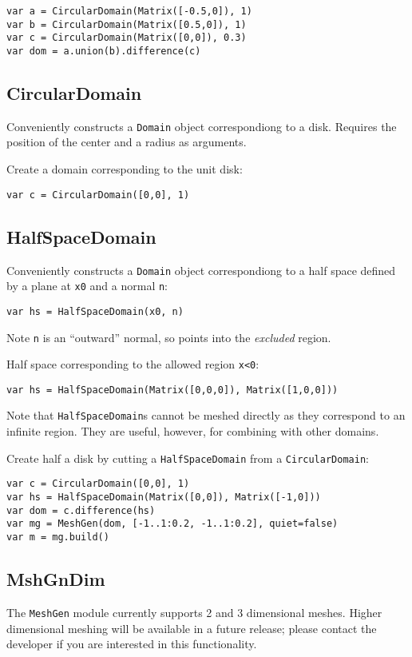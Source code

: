\begin{lstlisting}
var a = CircularDomain(Matrix([-0.5,0]), 1)
var b = CircularDomain(Matrix([0.5,0]), 1)
var c = CircularDomain(Matrix([0,0]), 0.3)
var dom = a.union(b).difference(c)
\end{lstlisting}

\hypertarget{circulardomain}{%
\subsection{CircularDomain}\label{circulardomain}}

Conveniently constructs a \texttt{Domain} object correspondiong to a
disk. Requires the position of the center and a radius as arguments.

Create a domain corresponding to the unit disk:

\begin{lstlisting}
var c = CircularDomain([0,0], 1)
\end{lstlisting}

\hypertarget{halfspacedomain}{%
\subsection{HalfSpaceDomain}\label{halfspacedomain}}

Conveniently constructs a \texttt{Domain} object correspondiong to a
half space defined by a plane at \texttt{x0} and a normal \texttt{n}:

\begin{lstlisting}
var hs = HalfSpaceDomain(x0, n)
\end{lstlisting}

Note \texttt{n} is an ``outward'' normal, so points into the
\emph{excluded} region.

Half space corresponding to the allowed region \texttt{x\textless{}0}:

\begin{lstlisting}
var hs = HalfSpaceDomain(Matrix([0,0,0]), Matrix([1,0,0]))
\end{lstlisting}

Note that \texttt{HalfSpaceDomain}s cannot be meshed directly as they
correspond to an infinite region. They are useful, however, for
combining with other domains.

Create half a disk by cutting a \texttt{HalfSpaceDomain} from a
\texttt{CircularDomain}:

\begin{lstlisting}
var c = CircularDomain([0,0], 1)
var hs = HalfSpaceDomain(Matrix([0,0]), Matrix([-1,0]))
var dom = c.difference(hs) 
var mg = MeshGen(dom, [-1..1:0.2, -1..1:0.2], quiet=false)
var m = mg.build()
\end{lstlisting}

\hypertarget{mshgndim}{%
\subsection{MshGnDim}\label{mshgndim}}

The \texttt{MeshGen} module currently supports 2 and 3 dimensional
meshes. Higher dimensional meshing will be available in a future
release; please contact the developer if you are interested in this
functionality.
